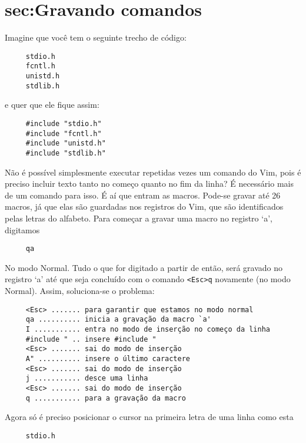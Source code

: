 \section{sec:Gravando comandos}\label{sec:Gravando comandos}

Imagine que você tem o seguinte trecho de código:

\begin{verbatim}
     stdio.h
     fcntl.h
     unistd.h
     stdlib.h
\end{verbatim}

e quer que ele fique assim:

\begin{verbatim}
     #include "stdio.h"
     #include "fcntl.h"
     #include "unistd.h"
     #include "stdlib.h"
\end{verbatim}

Não é possível simplesmente executar repetidas vezes um comando do Vim, pois
é preciso incluir texto tanto no começo quanto no fim da linha?  É necessário
mais de um comando para isso.  É aí que entram as macros. Pode-se gravar até 26
macros, já que elas são guardadas nos registros do Vim, que são identificados
pelas letras do alfabeto. Para começar a gravar uma macro no registro `a',
digitamos

\begin{verbatim}
     qa
\end{verbatim}

No modo Normal. Tudo o que for digitado a partir de então, será gravado no
registro `a' até que seja concluído com o comando
\verb|<Esc>q| novamente (no modo Normal). Assim,
soluciona-se o problema:

\begin{verbatim}
     <Esc> ....... para garantir que estamos no modo normal
     qa .......... inicia a gravação da macro `a'
     I ........... entra no modo de inserção no começo da linha
     #include " .. insere #include "
     <Esc> ....... sai do modo de inserção
     A" .......... insere o último caractere
     <Esc> ....... sai do modo de inserção
     j ........... desce uma linha
     <Esc> ....... sai do modo de inserção
     q ........... para a gravação da macro
\end{verbatim}

Agora só é preciso posicionar o cursor na primeira letra de uma linha como esta

\begin{verbatim}
     stdio.h
\end{verbatim}


